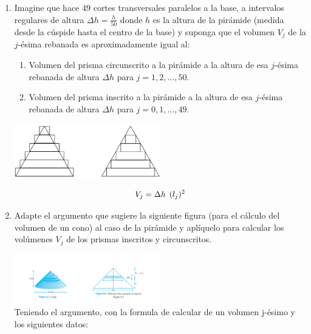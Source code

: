 \documentclass[12pt]{article}
\begin{document}
\begin{enumerate}

    \item Imagine que hace 49 cortes transversales paralelos a la base, a intervalos regulares de altura $\Delta h = \frac{h}{50}$ donde $h$ es la altura de la pirámide (medida desde la cúspide hasta el centro de la base) y suponga que el volumen $V_j$ de la $j$-ésima rebanada es aproximadamente igual al:
  
        \begin{enumerate}
  
            \item Volumen del prisma circunscrito a la pirámide a la altura de esa $j$-ésima rebanada de altura $\Delta h$ para $j = 1, 2, \dots, 50$.
  
            \item Volumen del prisma inscrito a la pirámide a la altura de esa $j$-ésima rebanada de altura $\Delta h$ para $j = 0, 1, \dots, 49$.
  
        \end{enumerate}
  
        \includegraphics[width=0.5\textwidth, center]{piramide5.png}
  
        \[V_j = \Delta h \hspace{4.4pt}(l_j)^2\]

    \item Adapte el argumento que sugiere la siguiente figura (para el cálculo del volumen de un cono) al caso de la pirámide y aplíquelo para calcular los volúmenes $V_j$ de los prismas inscritos y circunscritos. 
 
        \includegraphics[width=0.5\textwidth, center]{cono.png} \\
        
        Teniendo el argumento, con la formula de calcular de un volumen j-ésimo y los siguientes datos:
    

\end{enumerate}
\end{document}
